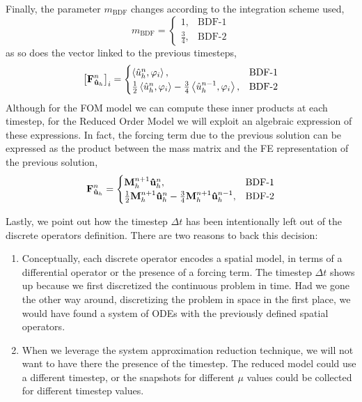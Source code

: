 \documentclass[../main.tex]{subfiles}
\newcommand{\inner}[2]{\left<#1, #2\right>}
\begin{document}
Finally, the parameter $m_{\text{BDF}}$ changes according to the integration scheme used,
\begin{equation}
    m_{\text{BDF}} = 
    \begin{cases}
    1, &\text{BDF-1} \\    
    \frac{3}{4}, &\text{BDF-2}    
    \end{cases}
\end{equation}
as so does the vector linked to the previous timesteps, 
\begin{equation}
    \left[\vb{F}_{\vb{\hat{u}}_h}^{n}\right]_{i} = 
    \begin{cases}
        \inner{\hat{u}_h^{n}}{\varphi_i}, &\text{BDF-1} \\
        \frac{1}{2}\inner{\hat{u}_h^{n}}{\varphi_i}
        - \frac{3}{4}\inner{\hat{u}_h^{n-1}}{\varphi_i}, &\text{BDF-2}
    \end{cases}
\end{equation}
Although for the FOM model we can compute these inner products at each timestep, for the Reduced Order Model we will exploit an algebraic expression of these expressions.
In fact, the forcing term due to the previous solution can be expressed as the product between the mass matrix and the FE representation of the previous solution, 
\begin{equation}
    \label{eq:1d_fom_forcing_term_time_mass_matrix}
    \vb{F}_{\vb{\hat{u}}_h}^{n}= 
    \begin{cases}
        \vb{M}_{h}^{n+1} \vb{\hat{u}}_{h}^{n}, &\text{BDF-1} \\
        \frac{1}{2}\vb{M}_{h}^{n+1} \vb{\hat{u}}_{h}^{n}
        - \frac{3}{4}\vb{M}_{h}^{n+1} \vb{\hat{u}}_{h}^{n-1}, &\text{BDF-2}
    \end{cases}
\end{equation}

Lastly, we point out how the timestep $\Delta t$ has been intentionally left out of the discrete operators definition.
There are two reasons to back this decision:
\begin{enumerate}
    \item Conceptually, each discrete operator encodes a spatial model, in terms of a differential operator or the presence of a forcing term.
    The timestep $\Delta t$ shows up because we first discretized the continuous problem in time. 
    Had we gone the other way around, discretizing the problem in space in the first place, we would have found a system of ODEs with the previously defined spatial operators. 
    \item When we leverage the system approximation reduction technique, we will not want to have there the presence of the timestep.
    The reduced model could use a different timestep, or the snapshots for different $\mu$ values could be collected for different timestep values.
\end{enumerate} 
\end{document}
